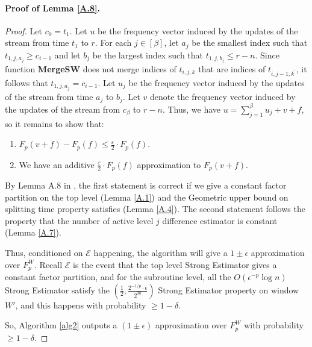 \documentclass{article}
\newcommand{\est}{\textsf{Strong Estimator }}
\theoremstyle{plain}
\begin{document}
\paragraph{Proof of Lemma \ref{A.8}.}
\begin{proof}
Let $c_0=t_1$. Let $u$ be the frequency vector induced by the updates of the stream from time $t_1$ to $r$. For each $j \in[\beta]$, let $a_j$ be the smallest index such that $t_{1, j, a_j} \geq c_{i-1}$ and let $b_j$ be the largest index such that $t_{1, j, b_j} \leq r-n$. Since function \textbf{MergeSW} does not merge indices of $t_{i, j, k}$ that are indices of $t_{i, j-1, k^{\prime}}$, it follows that $t_{1, j, a_j}=c_{i-1}$. Let $u_j$ be the frequency vector induced by the updates of the stream from time $a_j$ to $b_j$. Let $v$ denote the frequency vector induced by the updates of the stream from $c_\beta$ to $r-n$. Thus, we have $u=\sum_{j=1}^\beta u_j+v+f$, so it remains to show that:
\begin{enumerate}
    \item $F_p(v+f)-F_p(f) \leq \frac{\varepsilon}{2} \cdot F_p(f)$.
    \item We have an additive $\frac{\varepsilon}{2} \cdot F_p(f)$ approximation to $F_p(v+f)$.
\end{enumerate}

By Lemma A.8 in \cite{woodruff2022tight}, the first statement is correct if we give a constant factor partition on the top level (Lemma \ref{A.1}) and the Geometric upper bound on splitting time property satisfies (Lemma \ref{A.4}). The second statement follows the property that the number of active level $j$ difference estimator is constant (Lemma \ref{A.7}). 

Thus, conditioned on $\mathcal{E}$ happening, the algorithm will give a $1\pm \epsilon$ approximation over $F_p ^ W$.  Recall $\mathcal{E}$ is the event that the top level \est gives a constant factor partition, and for the subroutine level, all the $O(\epsilon ^ {-p} \log n)$ \est satisfy the $(\frac 12, \frac {2 ^ {-1/p}\cdot \epsilon}{2 ^ {30}})$ \est property on window $W'$, and this happens with probability $\ge 1 - \delta$.

So, Algorithm \ref{alg2} outputs a $(1\pm \epsilon)$ approximation over $F_p ^ W$ with probability $\ge 1 - \delta$.

\end{proof}
\end{document}

